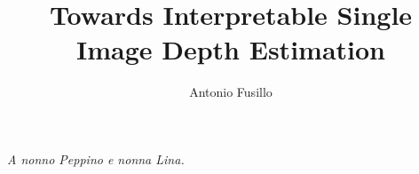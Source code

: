 \documentclass{styles/tthesis}
\title{Towards Interpretable Single Image Depth Estimation}
\author{Antonio Fusillo}
\begin{document}


\printfrontpage




\chapter*{\mbox{}}

\begin{flushright}
\thispagestyle{empty}
\null{}
{\it A nonno Peppino e nonna Lina.

}
\null
\end{flushright}
%
\thispagestyle{empty}
\mbox{}
\newpage


%


\tableofcontents

\mainmatter









\label{Bibliography}


\end{document}
